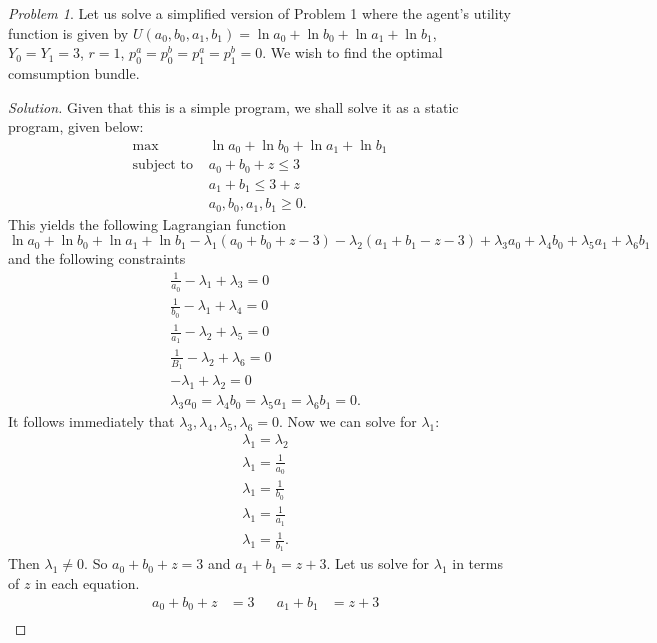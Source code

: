 \documentclass[12pt]{article}
\theoremstyle{definition}
\theoremstyle{remark}
\newtheorem{prob}{Problem}[section]
\def\la{\lambda}
\begin{document}
\section{}
\begin{prob}
  Let us solve a simplified version of Problem 1 where the agent's utility function is given by $U(a_0, b_0, a_1, b_1) = \ln a_0 + \ln b_0 + \ln a_1 + \ln b_1$, $Y_0 = Y_1 = 3$, $r = 1$, $p_0^a = p_0^b = p_1^a = p_1^b = 0$. We wish to find the optimal comsumption bundle.
\end{prob}
\begin{proof}[Solution]
  Given that this is a simple program, we shall solve it as a static program, given below:
  \begin{align*}
    \max &\ln a_0 + \ln b_0 + \ln a_1 + \ln b_1 \\
    \text{subject to } &a_0 + b_0 + z \leq 3 \\
    & a_1 + b_1 \leq 3 + z \\
    &a_0, b_0, a_1, b_1 \geq 0.
  \end{align*}
  This yields the following Lagrangian function
  $$\ln a_0 + \ln b_0 + \ln a_1 + \ln b_1 - \la_1(a_0 + b_0 + z - 3) - \la_2(a_1 + b_1 - z - 3) + \la_3a_0 + \la_4b_0 + \la_5a_1 + \la_6b_1$$
  and the following constraints
  \begin{align*}
    &\frac{1}{a_0} - \la_1 + \la_3 = 0 \\
    &\frac{1}{b_0} - \la_1 + \la_4 = 0 \\
    &\frac{1}{a_1} - \la_2 + \la_5 = 0 \\
    &\frac{1}{B_1} - \la_2 + \la_6 = 0 \\
    &-\la_1 + \la_2 = 0 \\
    &\la_3a_0 = \la_4b_0 = \la_5a_1 = \la_6b_1 = 0.
  \end{align*}
  It follows immediately that $\la_3, \la_4, \la_5, \la_6 = 0$. Now we can solve for $\la_1$:
  \begin{align*}
    &\la_1 = \la_2 \\
    &\la_1 = \frac{1}{a_0} \\
    &\la_1 = \frac{1}{b_0} \\
    &\la_1 = \frac{1}{a_1} \\
    &\la_1 = \frac{1}{b_1}.
  \end{align*}
  Then $\la_1 \neq 0$. So $a_0 + b_0 + z = 3$ and $a_1 + b_1 = z + 3$. Let us solve for $\la_1$ in terms of $z$ in each equation.
  \begin{align*}
    &           & a_0 + b_0 + z &= 3 &          & a_1 + b_1 &= z + 3 & \\

\end{align*}
\end{proof}
\end{document}
